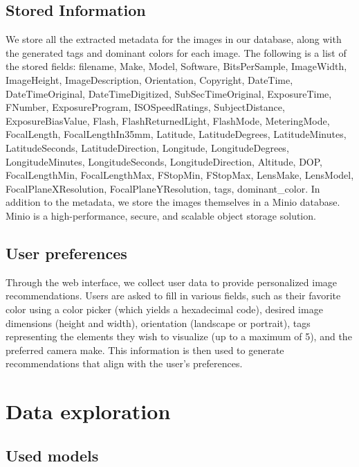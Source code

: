 \documentclass{article}
\begin{document}
    \subsection{Stored Information}\label{subsec:stored_infos}
    We store all the extracted metadata for the images in our database, along with the generated tags and dominant colors for each image.
    The following is a list of the stored fields: filename, Make, Model, Software, BitsPerSample, ImageWidth, ImageHeight, ImageDescription, Orientation, Copyright, DateTime, DateTimeOriginal, DateTimeDigitized, SubSecTimeOriginal, ExposureTime, FNumber, ExposureProgram, ISOSpeedRatings, SubjectDistance, ExposureBiasValue, Flash, FlashReturnedLight, FlashMode, MeteringMode, FocalLength, FocalLengthIn35mm, Latitude, LatitudeDegrees, LatitudeMinutes, LatitudeSeconds, LatitudeDirection, Longitude, LongitudeDegrees, LongitudeMinutes, LongitudeSeconds, LongitudeDirection, Altitude, DOP, FocalLengthMin, FocalLengthMax, FStopMin, FStopMax, LensMake, LensModel, FocalPlaneXResolution, FocalPlaneYResolution, tags, dominant\_color.
    In addition to the metadata, we store the images themselves in a Minio database.
    Minio is a high-performance, secure, and scalable object storage solution.

    \subsection{User preferences}\label{subsec:user_pref}
    Through the web interface, we collect user data to provide personalized image recommendations.
    Users are asked to fill in various fields, such as their favorite color using a color picker (which yields a hexadecimal code),
    desired image dimensions (height and width), orientation (landscape or portrait),
    tags representing the elements they wish to visualize (up to a maximum of 5), and the preferred camera make.
    This information is then used to generate recommendations that align with the user's preferences.


    \section{Data exploration}\label{sec:exploration}

    \subsection{Used models}\label{subsec:models}
\end{document}
